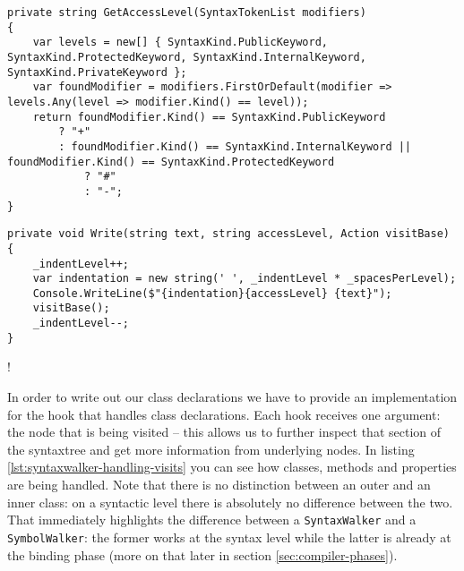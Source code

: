 \begin{minipage}{\linewidth}
\begin{lstlisting}[label={lst:syntaxwalker-extracting-access-modifier}]
private string GetAccessLevel(SyntaxTokenList modifiers)
{
    var levels = new[] { SyntaxKind.PublicKeyword, SyntaxKind.ProtectedKeyword, SyntaxKind.InternalKeyword, SyntaxKind.PrivateKeyword };
    var foundModifier = modifiers.FirstOrDefault(modifier => levels.Any(level => modifier.Kind() == level));
    return foundModifier.Kind() == SyntaxKind.PublicKeyword
		? "+"
		: foundModifier.Kind() == SyntaxKind.InternalKeyword || foundModifier.Kind() == SyntaxKind.ProtectedKeyword
			? "#"
			: "-";
}
\end{lstlisting}

\begin{lstlisting}[label={lst:syntaxwalker-write-to-console}]
private void Write(string text, string accessLevel, Action visitBase)
{
    _indentLevel++;
    var indentation = new string(' ', _indentLevel * _spacesPerLevel);
    Console.WriteLine($"{indentation}{accessLevel} {text}");
    visitBase();
	_indentLevel--;
}
\end{lstlisting}
\end{minipage}
\ifx{\verb+$+}!\fi %

In order to write out our class declarations we have to provide an implementation for the hook that handles class declarations. Each hook receives one argument: the node that is being visited -- this allows us to further inspect that section of the \gls{syntaxtree} and get more information from underlying nodes. In listing \ref{lst:syntaxwalker-handling-visits} you can see how classes, methods and properties are being handled. Note that there is no distinction between an outer and an inner class: on a syntactic level there is absolutely no difference between the two. That immediately highlights the difference between a \texttt{SyntaxWalker} and a \texttt{SymbolWalker}: the former works at the \gls{syntax} level while the latter is already at the binding phase (more on that later in section \ref{sec:compiler-phases}).

